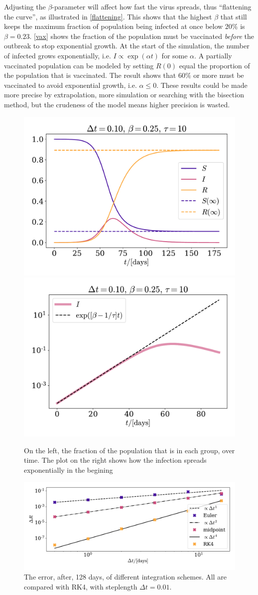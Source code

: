 \documentclass{article}
\begin{document}
    Adjusting the $\beta$-parameter will affect how fast the virus spreads, thus ``flattening the curve'', as illustrated in \autoref{flattening}.
    This shows that the highest $\beta$ that still keeps the maximum fraction of population being infected at once below $20\%$ is $\beta=0.23$. 
    \autoref{vax} shows the fraction of the population must be vaccinated \emph{before} the outbreak to stop exponential growth. 
    At the start of the simulation, the number of infected grows exponentially, i.e. $I \propto \exp(\alpha t)$ for some $\alpha$.
    A partially vaccinated population can be modeled by setting $R(0)$ equal the proportion of the population that is vaccinated.
    The result shows that $60\%$ or more must be vaccinated to avoid exponential growth, i.e. $\alpha\leq 0$. 
    These results could be made more precise by extrapolation, more simulation or searching with the bisection method, but the crudeness of the model means higher precision is wasted.

    \begin{figure}[H]
        \centering
        \includegraphics[width=.49\textwidth]{../plots/2A/TestSIR}
        \includegraphics[width=.49\textwidth]{../plots/2A/TestI}
        \caption{On the left, the fraction of the population that is in each group, over time. The plot on the right shows how the infection spreads exponentially in the begining}
        \label{SIR}
    \end{figure}

    \begin{figure}[H]
        \centering
        \includegraphics[width=.6\textwidth]{../plots/2A/conv}
        \caption{The error, after, 128 days, of different integration schemes. All are compared with RK4, with steplength $\Delta t = 0.01$.}
        \label{conv det}
    \end{figure}
\end{document}
